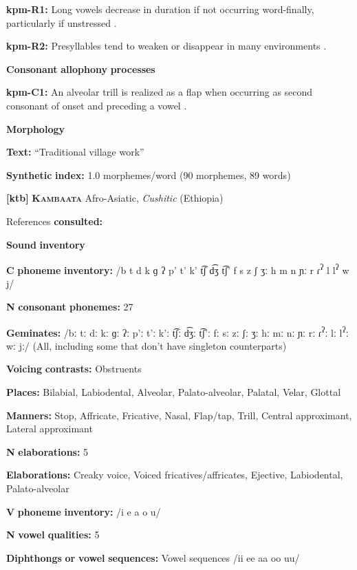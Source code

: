 \begin{styleBody}
\textbf{kpm-R1:}  Long vowels decrease in duration if not occurring word-finally, particularly if unstressed \citep[33]{Olsen2014}.

\textbf{kpm-R2:} Presyllables tend to weaken or disappear in many environments \citep[31]{Olsen2014}.

\textbf{Consonant} \textbf{allophony} \textbf{processes}

\textbf{kpm-C1:} An alveolar trill is realized as a flap when occurring as second consonant of onset and preceding a vowel \citep[24]{Olsen2014}.

\textbf{Morphology}

\textbf{Text:} “Traditional village work” \citep[106-107]{Olsen2014}

\textbf{Synthetic} \textbf{index:} 1.0 morphemes/word (90 morphemes, 89 words)

\textbf{[ktb]}   \textbf{\textsc{Kambaata}}  Afro-Asiatic, \textit{Cushitic} (Ethiopia)

References \textbf{consulted:} \citet{Treis2008}

\textbf{Sound} \textbf{inventory}

\textbf{C} \textbf{phoneme} \textbf{inventory:} /b t d k ɡ ʔ p’ t’ k’ t͡ʃ d͡ʒ t͡ʃ’ f s z ʃ ʒː h m n ɲː r ɾ\textsuperscript{ʔ} l l\textsuperscript{ʔ} w j/

\textbf{N} \textbf{consonant} \textbf{phonemes:} 27

\textbf{Geminates:} /bː tː dː kː ɡː ʔː p’ː t’ː k’ː t͡ʃː d͡ʒː t͡ʃ’ː fː sː zː ʃː ʒː hː mː nː ɲː rː ɾ\textsuperscript{ʔ}ː lː l\textsuperscript{ʔ}ː wː jː/ (All, including some that don’t have singleton counterparts)

\textbf{Voicing} \textbf{contrasts:} Obstruents

\textbf{Places:} Bilabial, Labiodental, Alveolar, Palato-alveolar, Palatal, Velar, Glottal

\textbf{Manners:} Stop, Affricate, Fricative, Nasal, Flap/tap, Trill, Central approximant, Lateral approximant

\textbf{N} \textbf{elaborations:} 5

\textbf{Elaborations:} Creaky voice, Voiced fricatives/affricates, Ejective, Labiodental, Palato-alveolar

\textbf{V} \textbf{phoneme} \textbf{inventory:} /i e a o u/

\textbf{N} \textbf{vowel} \textbf{qualities:} 5

\textbf{Diphthongs} \textbf{or} \textbf{vowel} \textbf{sequences:} Vowel sequences /ii ee aa oo uu/


\end{styleBody}
